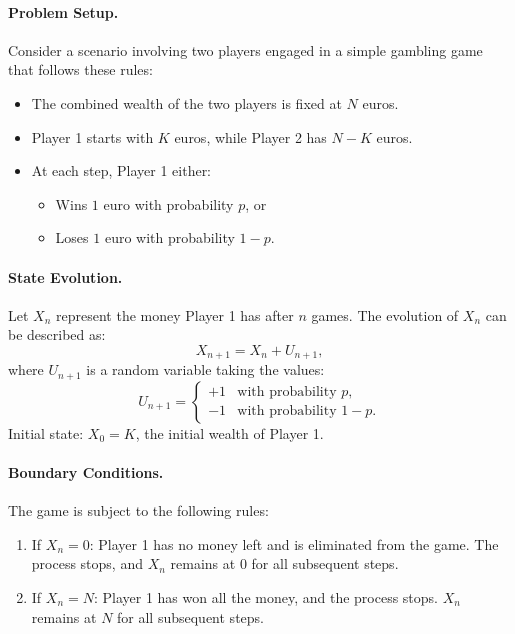 \paragraph{Problem Setup.}
Consider a scenario involving two players engaged in a simple gambling game that follows these rules:
\begin{itemize}
    \item The combined wealth of the two players is fixed at \( N \) euros.
    \item Player 1 starts with \( K \) euros, while Player 2 has \( N - K \) euros.
    \item At each step, Player 1 either: 
        \begin{itemize}
            \item Wins \( 1 \) euro with probability \( p \), or
            \item Loses \( 1 \) euro with probability \( 1 - p \).
        \end{itemize}
\end{itemize}

\paragraph{State Evolution.}
Let \( X_n \) represent the money Player 1 has after \( n \) games. The evolution of \( X_n \) can be described as:
\[
X_{n+1} = X_n + U_{n+1},
\]
where \( U_{n+1} \) is a random variable taking the values:
\[
U_{n+1} =
\begin{cases}
+1 & \text{with probability } p, \\
-1 & \text{with probability } 1-p.
\end{cases}
\]
Initial state: \( X_0 = K \), the initial wealth of Player 1.

\paragraph{Boundary Conditions.}
The game is subject to the following rules:
\begin{enumerate}
    \item If \( X_n = 0 \): Player 1 has no money left and is eliminated from the game. The process stops, and \( X_n \) remains at \( 0 \) for all subsequent steps.
    \item If \( X_n = N \): Player 1 has won all the money, and the process stops. \( X_n \) remains at \( N \) for all subsequent steps.
\end{enumerate}

